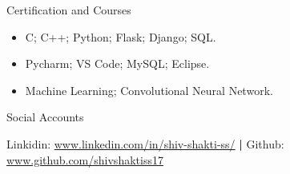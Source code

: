 \documentclass[]{shivshakti}
\begin{document}
	\begin{cvsection}{Certification and Courses}
		\begin{cvsubsection}{}{}{}	
			\begin{itemize}
				\item C; C++; Python; Flask; Django; SQL.
				\item Pycharm; VS Code; MySQL; Eclipse. 
				\item Machine Learning; Convolutional Neural Network.
				
			\end{itemize}
		\end{cvsubsection}
	\end{cvsection}
	
	\begin{cvsection}{Social Accounts}
		\begin{cvsubsection}{}{}{}	
			Linkidin: \url{www.linkedin.com/in/shiv-shakti-ss/} \textbf{|}  Github: \url{www.github.com/shivshaktiss17}
		\end{cvsubsection}
	\end{cvsection}
	
\end{document}

